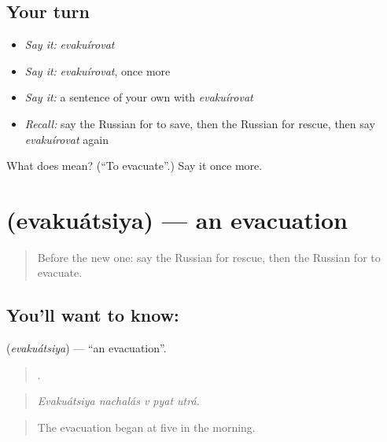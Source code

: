 \subsection*{Your turn}
\begin{itemize}
\raggedright
  \item \emph{Say it:} \emph{evakuírovat}
  \item \emph{Say it:} \emph{evakuírovat}, once more
  \item \emph{Say it:} a sentence of your own with \emph{evakuírovat}
  \item \emph{Recall:} say the Russian for to save, then the Russian for rescue, then say \emph{evakuírovat} again
\end{itemize}

\begin{tcolorbox}[breakable,colback=teal!4,colframe=teal!35!black,title={Before you move on}]
What does  mean? (\textquotedblleft{}To evacuate\textquotedblright{}.) Say it once more.
\end{tcolorbox}
\section[\texorpdfstring{\ru{эвакуация} (evakuátsiya)}{эвакуация (evakuátsiya)}]{ (evakuátsiya) — an evacuation}

\label{lesson:RU-C296-evakuatsiya}



\begin{quote}
Before the new one: say the Russian for rescue, then the Russian for to evacuate.
\end{quote}

\subsection*{You'll want to know: }
\textbf{} (\emph{evakuátsiya}) — \textquotedblleft{}an evacuation\textquotedblright{}.

\begin{quote}
    .
\end{quote}

\begin{quote}
\emph{Evakuátsiya nachalás v pyat utrá.}
\end{quote}

\begin{quote}
The evacuation began at five in the morning.
\end{quote}

